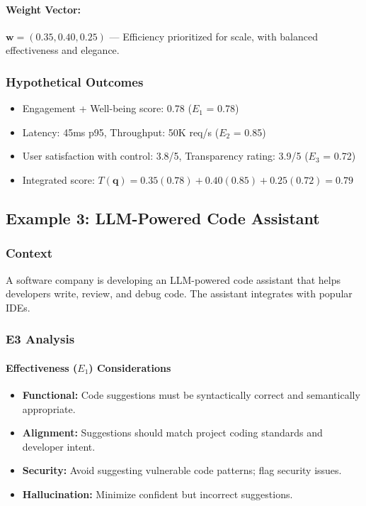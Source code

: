 \paragraph{Weight Vector:} $\mathbf{w} = (0.35, 0.40, 0.25)$ — Efficiency prioritized for scale, with balanced effectiveness and elegance.

\subsubsection{Hypothetical Outcomes}

\begin{itemize}[leftmargin=2em]
    \item Engagement + Well-being score: 0.78 ($E_1$ = 0.78)
    \item Latency: 45ms p95, Throughput: 50K req/s ($E_2$ = 0.85)
    \item User satisfaction with control: 3.8/5, Transparency rating: 3.9/5 ($E_3$ = 0.72)
    \item Integrated score: $T(\mathbf{q}) = 0.35(0.78) + 0.40(0.85) + 0.25(0.72) = 0.79$
\end{itemize}

\subsection{Example 3: LLM-Powered Code Assistant}

\subsubsection{Context}

A software company is developing an LLM-powered code assistant that helps developers write, review, and debug code. The assistant integrates with popular IDEs.

\subsubsection{E3 Analysis}

\paragraph{Effectiveness ($E_1$) Considerations}

\begin{itemize}[leftmargin=2em]
    \item \textbf{Functional:} Code suggestions must be syntactically correct and semantically appropriate.
    \item \textbf{Alignment:} Suggestions should match project coding standards and developer intent.
    \item \textbf{Security:} Avoid suggesting vulnerable code patterns; flag security issues.
    \item \textbf{Hallucination:} Minimize confident but incorrect suggestions.
\end{itemize}

